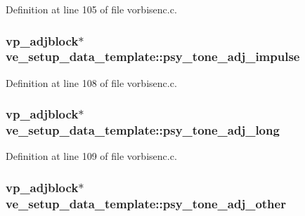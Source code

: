Definition at line 105 of file vorbisenc.\+c.

\subsubsection[{\texorpdfstring{psy\+\_\+tone\+\_\+adj\+\_\+impulse}{psy_tone_adj_impulse}}]{ {\bf vp\+\_\+adjblock}$\ast$ ve\+\_\+setup\+\_\+data\+\_\+template\+::psy\+\_\+tone\+\_\+adj\+\_\+impulse}\hypertarget{structve__setup__data__template_a94bab40c77f31b7e138c83a04631facf}{}\label{structve__setup__data__template_a94bab40c77f31b7e138c83a04631facf}


Definition at line 108 of file vorbisenc.\+c.

\subsubsection[{\texorpdfstring{psy\+\_\+tone\+\_\+adj\+\_\+long}{psy_tone_adj_long}}]{ {\bf vp\+\_\+adjblock}$\ast$ ve\+\_\+setup\+\_\+data\+\_\+template\+::psy\+\_\+tone\+\_\+adj\+\_\+long}\hypertarget{structve__setup__data__template_a83d194063b0ffb4e63364b37547de257}{}\label{structve__setup__data__template_a83d194063b0ffb4e63364b37547de257}


Definition at line 109 of file vorbisenc.\+c.

\subsubsection[{\texorpdfstring{psy\+\_\+tone\+\_\+adj\+\_\+other}{psy_tone_adj_other}}]{ {\bf vp\+\_\+adjblock}$\ast$ ve\+\_\+setup\+\_\+data\+\_\+template\+::psy\+\_\+tone\+\_\+adj\+\_\+other}\hypertarget{structve__setup__data__template_a5f1ca97517cd1e0a0138e58c1094a9f9}{}\label{structve__setup__data__template_a5f1ca97517cd1e0a0138e58c1094a9f9}


